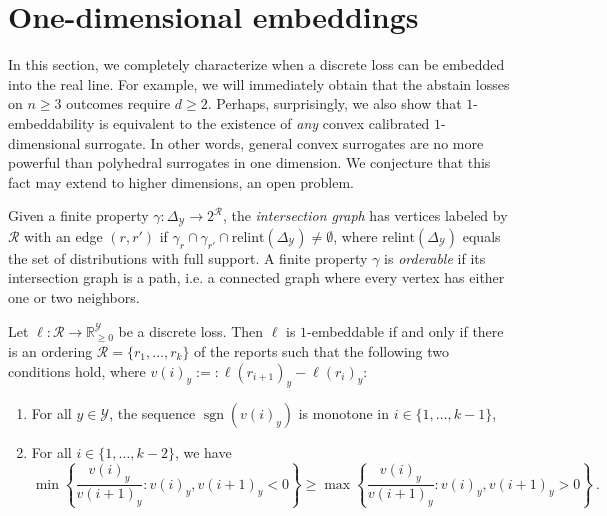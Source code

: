 \documentclass[anon]{colt2020} %
\newcommand{\reals}{\mathbb{R}}
\newcommand{\nonnegreals}{\reals_{\geq 0}}%
\newcommand{\relint}{\mathrm{relint}}
\newcommand{\simplex}{\Delta_\Y}
\newcommand{\R}{\mathcal{R}}
\newcommand{\Y}{\mathcal{Y}}
\DeclareMathOperator*{\sgn}{sgn}
\newtheorem{observation}{Observation}
\begin{document}
\section{One-dimensional embeddings}
\label{sec:1d}

In this section, we completely characterize when a discrete loss can be embedded into the real line.
For example, we will immediately obtain that the abstain losses on $n \geq 3$ outcomes require $d \geq 2$.
Perhaps, surprisingly, we also show that $1$-embeddability is equivalent to the existence of \emph{any} convex calibrated $1$-dimensional surrogate.
In other words, general convex surrogates are no more powerful than polyhedral surrogates in one dimension.
We conjecture that this fact may extend to higher dimensions, an open problem.

\begin{definition}
  Given a finite property $\gamma: \simplex \to 2^{\R}$, the \emph{intersection graph} has vertices labeled by $\R$ with an edge $(r,r')$ if $\gamma_r \cap \gamma_{r'} \cap \relint(\simplex) \neq \emptyset$, where $\relint(\simplex)$ equals the set of distributions with full support.
  A finite property $\gamma$ is \emph{orderable} if its intersection graph is a path, i.e. a connected graph where every vertex has either one or two neighbors.
\end{definition}


\begin{theorem}
  Let $\ell: \R \to \nonnegreals^{\Y}$ be a discrete loss.
  Then $\ell$ is $1$-embeddable if and only if there is an ordering $\R = \{r_1,\ldots,r_k\}$ of the reports such that the following two conditions hold, where $v(i)_y := : \ell(r_{i+1})_y - \ell(r_i)_y$:
  \begin{enumerate}
  \item For all $y\in\Y$, the sequence $\sgn(v(i)_y)$ is monotone in
    $i\in\{1,\ldots,k-1\}$, 
  \item For all $i\in\{1,\ldots,k-2\}$, we have
    \begin{equation}
      \label{eq:1}
      \min \left\{\frac{v(i)_y}{v({i+1})_y} : v(i)_y, v({i+1})_y < 0\right\}
      \geq
      \max \left\{\frac{v(i)_y}{v({i+1})_y} : v(i)_y, v({i+1})_y > 0\right\}~.
    \end{equation}
  \end{enumerate}
\end{theorem}
\end{document}
